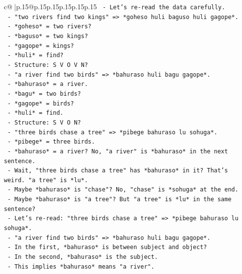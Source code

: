 \documentclass{article}
\begin{document}
{\begin{supertabular}{c@{$\;$}|p{.15\linewidth}@{}p{.15\linewidth}p{.15\linewidth}p{.15\linewidth}p{.15\linewidth}p{.15\linewidth}}
{{{\texttt{          {-} Let's re{-}read the data carefully.} \\
\texttt{          {-} "two rivers find two kings" => *goheso huli baguso huli gagope*.} \\
\texttt{            {-} *goheso* = two rivers?} \\
\texttt{            {-} *baguso* = two kings?} \\
\texttt{            {-} *gagope* = kings?} \\
\texttt{            {-} *huli* = find?} \\
\texttt{            {-} Structure: S V O V N?} \\
\texttt{          {-} "a river find two birds" => *bahuraso huli bagu gagope*.} \\
\texttt{            {-} *bahuraso* = a river.} \\
\texttt{            {-} *bagu* = two birds?} \\
\texttt{            {-} *gagope* = birds?} \\
\texttt{            {-} *huli* = find.} \\
\texttt{            {-} Structure: S V O N?} \\
\texttt{          {-} "three birds chase a tree" => *pibege bahuraso lu sohuga*.} \\
\texttt{            {-} *pibege* = three birds.} \\
\texttt{            {-} *bahuraso* = a river? No, "a river" is *bahuraso* in the next sentence.} \\
\texttt{            {-} Wait, "three birds chase a tree" has *bahuraso* in it? That's weird. "a tree" is *lu*.} \\
\texttt{            {-} Maybe *bahuraso* is "chase"? No, "chase" is *sohuga* at the end.} \\
\texttt{            {-} Maybe *bahuraso* is "a tree"? But "a tree" is *lu* in the same sentence?} \\
\texttt{            {-} Let's re{-}read: "three birds chase a tree" => *pibege bahuraso lu sohuga*.} \\
\texttt{            {-} "a river find two birds" => *bahuraso huli bagu gagope*.} \\
\texttt{            {-} In the first, *bahuraso* is between subject and object?} \\
\texttt{            {-} In the second, *bahuraso* is the subject.} \\
\texttt{            {-} This implies *bahuraso* means "a river".} \\
}}}
\end{supertabular}}
\end{document}
